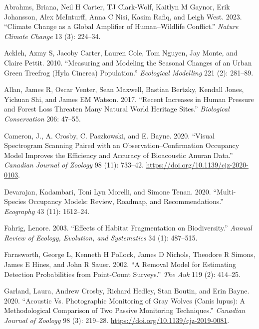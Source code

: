 \documentclass[
  letterpaper,
  DIV=11,
  numbers=noendperiod]{scrartcl}
\newlength{\cslhangindent}
\newenvironment{CSLReferences}[2] %
 {\begin{list}{}{%
  \setlength{\itemindent}{0pt}
  \setlength{\leftmargin}{0pt}
  \setlength{\parsep}{0pt}
  \ifodd #1
   \setlength{\leftmargin}{\cslhangindent}
   \setlength{\itemindent}{-1\cslhangindent}
  \fi
  \setlength{\itemsep}{#2\baselineskip}}}
 {\end{list}}
\begin{document}
\label{refs}
\begin{CSLReferences}{1}{0}
Abrahms, Briana, Neil H Carter, TJ Clark-Wolf, Kaitlyn M Gaynor, Erik
Johansson, Alex McInturff, Anna C Nisi, Kasim Rafiq, and Leigh West.
2023. {``Climate Change as a Global Amplifier of Human--Wildlife
Conflict.''} \emph{Nature Climate Change} 13 (3): 224--34.

Ackleh, Azmy S, Jacoby Carter, Lauren Cole, Tom Nguyen, Jay Monte, and
Claire Pettit. 2010. {``Measuring and Modeling the Seasonal Changes of
an Urban Green Treefrog (Hyla Cinerea) Population.''} \emph{Ecological
Modelling} 221 (2): 281--89.

Allan, James R, Oscar Venter, Sean Maxwell, Bastian Bertzky, Kendall
Jones, Yichuan Shi, and James EM Watson. 2017. {``Recent Increases in
Human Pressure and Forest Loss Threaten Many Natural World Heritage
Sites.''} \emph{Biological Conservation} 206: 47--55.

Cameron, J., A. Crosby, C. Paszkowski, and E. Bayne. 2020. {``Visual
Spectrogram Scanning Paired with an Observation--Confirmation Occupancy
Model Improves the Efficiency and Accuracy of Bioacoustic Anuran
Data.''} \emph{Canadian Journal of Zoology} 98 (11): 733--42.
\url{https://doi.org/10.1139/cjz-2020-0103}.

Devarajan, Kadambari, Toni Lyn Morelli, and Simone Tenan. 2020.
{``Multi-Species Occupancy Models: Review, Roadmap, and
Recommendations.''} \emph{Ecography} 43 (11): 1612--24.

Fahrig, Lenore. 2003. {``Effects of Habitat Fragmentation on
Biodiversity.''} \emph{Annual Review of Ecology, Evolution, and
Systematics} 34 (1): 487--515.

Farnsworth, George L, Kenneth H Pollock, James D Nichols, Theodore R
Simons, James E Hines, and John R Sauer. 2002. {``A Removal Model for
Estimating Detection Probabilities from Point-Count Surveys.''}
\emph{The Auk} 119 (2): 414--25.

Garland, Laura, Andrew Crosby, Richard Hedley, Stan Boutin, and Erin
Bayne. 2020. {``Acoustic Vs. Photographic Monitoring of Gray Wolves
({Canis lupus}): A Methodological Comparison of Two Passive Monitoring
Techniques.''} \emph{Canadian Journal of Zoology} 98 (3): 219--28.
\url{https://doi.org/10.1139/cjz-2019-0081}.


\end{CSLReferences}
\end{document}
